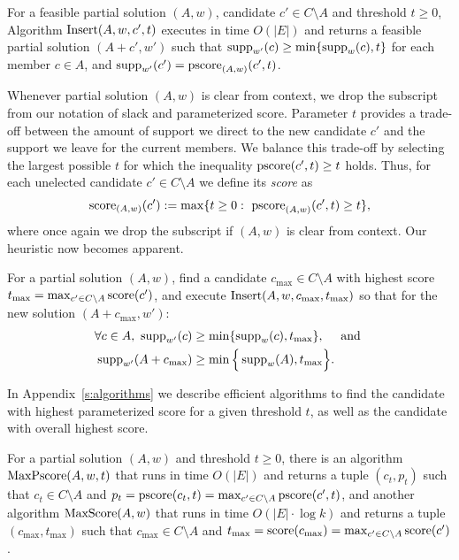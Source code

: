 \begin{lemma}\label{lem:insert}
For a feasible partial solution $(A,w)$, candidate $c'\in C\setminus A$ and threshold $t\geq 0$, 
Algorithm $\operatorname{Insert}(A,w,c',t)$ executes in time $O(|E|)$ and returns a feasible partial solution $(A+c',w')$ 
such that $\operatorname{supp}_{w'}(c)\geq \min\{\operatorname{supp}_w(c),t\}$ for each member $c\in A$, and $\operatorname{supp}_{w'}(c')=\operatorname{pscore}_{(A,w)}(c',t)$. 
\end{lemma}

Whenever partial solution $(A,w)$ is clear from context, we drop the subscript from our notation of slack and parameterized score. %
%
Parameter $t$ provides a trade-off between the amount of support we direct to the new candidate $c'$ and the support we leave for the current members. We balance this trade-off by selecting the largest possible $t$ for which the inequality $\operatorname{pscore}(c',t)\geq t$ holds.
Thus, for each unelected candidate $c'\in C\setminus A$ we define its \emph{score} as 
%
\begin{align}
    \operatorname{score}_{(A,w)}(c'):=\max\{t\geq 0: \ \operatorname{pscore}_{(A,w)}(c',t)\geq t\},
\end{align}
%
where once again we drop the subscript if $(A,w)$ is clear from context. Our heuristic now becomes apparent.

\begin{heuristic}
For a partial solution $(A,w)$, find a candidate $c_{\max}\in C\setminus A$ with highest score $t_{\max}=\max_{c'\in C\setminus A} \operatorname{score}(c')$, and execute $\operatorname{Insert}(A,w,c_{\max},t_{\max})$ so that for the new solution $(A+c_{\max},w')$: 
%
\begin{align*}
\forall c\in A, \ \operatorname{supp}_{w'}(c) &\geq \min\{\operatorname{supp}_w(c), t_{\max}\}, \quad \text{ and } \\
 \operatorname{supp}_{w'}(A+c_{\max}) &\geq \min \Big\{ \operatorname{supp}_w(A), t_{\max}\Big\}.
\end{align*}
\end{heuristic}

In Appendix~\ref{s:algorithms} we describe efficient algorithms to find the candidate with highest parameterized score for a given threshold $t$, as well as the candidate with overall highest score.

\begin{theorem}\label{thm:runtimes}
For a partial solution $(A,w)$ and threshold $t\geq 0$, there is an algorithm $\operatorname{MaxPscore}(A,w,t)$ that runs in time $O(|E|)$ and returns a tuple $(c_t,p_t)$ such that $c_t\in C\setminus A$ and $p_t=\operatorname{pscore}(c_t,t)=\max_{c'\in C\setminus A} \operatorname{pscore}(c',t)$, 
and another algorithm $\operatorname{MaxScore}(A,w)$ that runs in time $O(|E|\cdot \log k)$ and returns a tuple $(c_{\max}, t_{\max})$ such that $c_{\max}\in C\setminus A$ and $t_{\max}=\operatorname{score}(c_{\max})=\max_{c'\in C\setminus A} \operatorname{score}(c')$.
\end{theorem}


